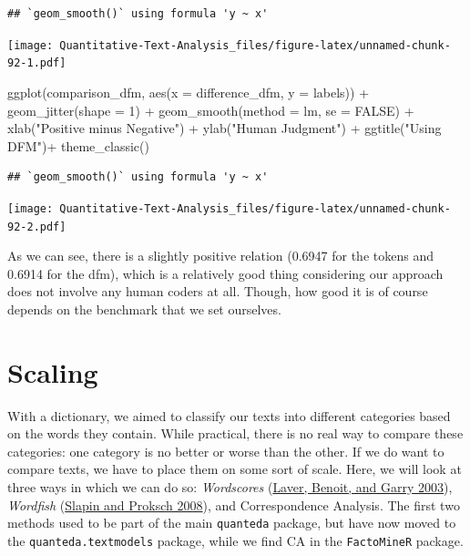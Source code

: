\documentclass[
]{book}
\newenvironment{Shaded}{\begin{snugshade}}{\end{snugshade}}
\newcommand{\AttributeTok}[1]{\textcolor[rgb]{0.77,0.63,0.00}{#1}}
\newcommand{\ConstantTok}[1]{\textcolor[rgb]{0.00,0.00,0.00}{#1}}
\newcommand{\DecValTok}[1]{\textcolor[rgb]{0.00,0.00,0.81}{#1}}
\newcommand{\FunctionTok}[1]{\textcolor[rgb]{0.00,0.00,0.00}{#1}}
\newcommand{\NormalTok}[1]{#1}
\newcommand{\SpecialCharTok}[1]{\textcolor[rgb]{0.00,0.00,0.00}{#1}}
\newcommand{\StringTok}[1]{\textcolor[rgb]{0.31,0.60,0.02}{#1}}
\begin{document}
\begin{verbatim}
## `geom_smooth()` using formula 'y ~ x'
\end{verbatim}

\texttt{[image: Quantitative-Text-Analysis\_files/figure-latex/unnamed-chunk-92-1.pdf]}

\begin{Shaded}
\begin{Highlighting}[]
\FunctionTok{ggplot}\NormalTok{(comparison\_dfm, }\FunctionTok{aes}\NormalTok{(}\AttributeTok{x =}\NormalTok{ difference\_dfm, }\AttributeTok{y =}\NormalTok{ labels)) }\SpecialCharTok{+}
  \FunctionTok{geom\_jitter}\NormalTok{(}\AttributeTok{shape =} \DecValTok{1}\NormalTok{) }\SpecialCharTok{+}
  \FunctionTok{geom\_smooth}\NormalTok{(}\AttributeTok{method =}\NormalTok{ lm, }\AttributeTok{se =} \ConstantTok{FALSE}\NormalTok{) }\SpecialCharTok{+}
  \FunctionTok{xlab}\NormalTok{(}\StringTok{"Positive minus Negative"}\NormalTok{) }\SpecialCharTok{+}
  \FunctionTok{ylab}\NormalTok{(}\StringTok{"Human Judgment"}\NormalTok{) }\SpecialCharTok{+}
  \FunctionTok{ggtitle}\NormalTok{(}\StringTok{"Using DFM"}\NormalTok{)}\SpecialCharTok{+}
  \FunctionTok{theme\_classic}\NormalTok{()}
\end{Highlighting}
\end{Shaded}

\begin{verbatim}
## `geom_smooth()` using formula 'y ~ x'
\end{verbatim}

\texttt{[image: Quantitative-Text-Analysis\_files/figure-latex/unnamed-chunk-92-2.pdf]}

As we can see, there is a slightly positive relation (0.6947 for the tokens and 0.6914 for the dfm), which is a relatively good thing considering our approach does not involve any human coders at all. Though, how good it is of course depends on the benchmark that we set ourselves.

\hypertarget{scaling}{%
\chapter{Scaling}\label{scaling}}

With a dictionary, we aimed to classify our texts into different categories based on the words they contain. While practical, there is no real way to compare these categories: one category is no better or worse than the other. If we do want to compare texts, we have to place them on some sort of scale. Here, we will look at three ways in which we can do so: \emph{Wordscores} (\protect\hyperlink{ref-Laver2003a}{Laver, Benoit, and Garry 2003}), \emph{Wordfish} (\protect\hyperlink{ref-Slapin2008a}{Slapin and Proksch 2008}), and Correspondence Analysis. The first two methods used to be part of the main \texttt{quanteda} package, but have now moved to the \texttt{quanteda.textmodels} package, while we find CA in the \texttt{FactoMineR} package.
\end{document}
